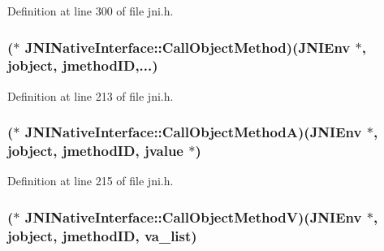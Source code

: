 Definition at line 300 of file jni.\-h.

\hypertarget{struct_j_n_i_native_interface_a59ea1d0c6bd014367ca0c0af0b36ce63}{
\subsubsection[{Call\-Object\-Method}]{($\ast$ J\-N\-I\-Native\-Interface\-::\-Call\-Object\-Method)({\bf J\-N\-I\-Env} $\ast$, {\bf jobject}, {\bf jmethod\-I\-D},...)}}\label{struct_j_n_i_native_interface_a59ea1d0c6bd014367ca0c0af0b36ce63}


Definition at line 213 of file jni.\-h.

\hypertarget{struct_j_n_i_native_interface_a840255697a5d4890fe234c5d05c9d2ce}{
\subsubsection[{Call\-Object\-Method\-A}]{($\ast$ J\-N\-I\-Native\-Interface\-::\-Call\-Object\-Method\-A)({\bf J\-N\-I\-Env} $\ast$, {\bf jobject}, {\bf jmethod\-I\-D}, {\bf jvalue} $\ast$)}}\label{struct_j_n_i_native_interface_a840255697a5d4890fe234c5d05c9d2ce}


Definition at line 215 of file jni.\-h.

\hypertarget{struct_j_n_i_native_interface_a2204f08fa26fc3b02f83c1b230a40c29}{
\subsubsection[{Call\-Object\-Method\-V}]{($\ast$ J\-N\-I\-Native\-Interface\-::\-Call\-Object\-Method\-V)({\bf J\-N\-I\-Env} $\ast$, {\bf jobject}, {\bf jmethod\-I\-D}, va\-\_\-list)}}\label{struct_j_n_i_native_interface_a2204f08fa26fc3b02f83c1b230a40c29}


